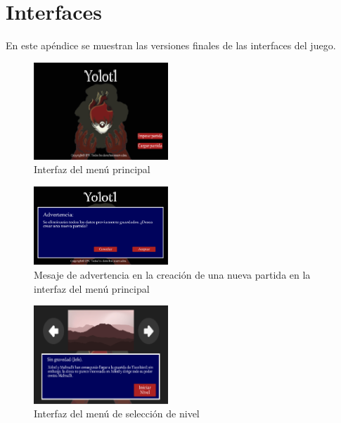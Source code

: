 \chapter{Interfaces}\label{Anexo:Intefaces}
En este apéndice se muestran las versiones finales de las interfaces del juego.

\begin{figure}[H]
    \centering
    \includegraphics[width=0.45\textwidth]{Anexos/Interfaces/menu01.png}
    \caption{Interfaz del menú principal}
    \label{fig:menuP}
\end{figure}

\begin{figure}[H]
    \centering
    \includegraphics[width=0.45\textwidth]{Anexos/Interfaces/menu02.png}
    \caption{Mesaje de advertencia en la creación de una nueva partida en la interfaz del 
    menú principal}
    \label{fig:menuP02}
\end{figure}

\begin{figure}[H]
    \centering
    \includegraphics[width=0.45\textwidth]{Anexos/Interfaces/menu03.png}
    \caption{Interfaz del menú de selección de nivel}
    \label{fig:menuP03}
\end{figure}


